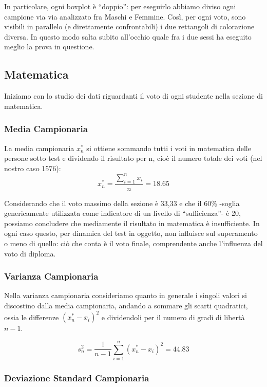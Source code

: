 In particolare, ogni boxplot è “doppio”: per eseguirlo abbiamo diviso ogni campione via via analizzato fra Maschi e Femmine. Così, per ogni voto, sono visibili in parallelo (e direttamente confrontabili) i due rettangoli di colorazione diversa. In questo modo salta subito all’occhio quale fra i due sessi ha eseguito meglio la prova in questione.
\clearpage
\subsection{Matematica}

Iniziamo con lo studio dei dati riguardanti il voto di ogni studente nella
sezione di matematica.

\subsubsection{Media Campionaria}

La media campionaria \(x_{n}^{*}\) si ottiene sommando tutti i voti in matematica
delle persone sotto test e dividendo il risultato per n, cioè il numero totale
dei voti (nel nostro caso 1576): 
\[
x_{n}^{*} = \frac{\sum_{i=1}^{n} x_{i}}{n} = 18.65
\]

Considerando che il voto massimo della sezione è 33,33 e che il 60\% -soglia
genericamente utilizzata come indicatore di un livello di “sufficienza”- è 20,
possiamo concludere che mediamente il risultato in matematica è
insufficiente. In ogni caso questo, per dinamica del test in
oggetto, non influisce sul superamento o meno di quello: ciò che
conta è il voto finale, comprendente anche l’influenza del voto di
diploma.

\subsubsection{Varianza Campionaria}

Nella varianza campionaria consideriamo quanto in generale i singoli valori si
discostino dalla media campionaria, andando a sommare gli scarti quadratici,
ossia le differenze \((x_n^* - x_i)^2\) e dividendoli per il numero di gradi di
libertà \(n-1\).

\[
s_n^2 = \frac{1}{n-1} \sum_{i=1}^{n}(x_n^* - x_i)^2 = 44.83
\]

\subsubsection{Deviazione Standard Campionaria}

